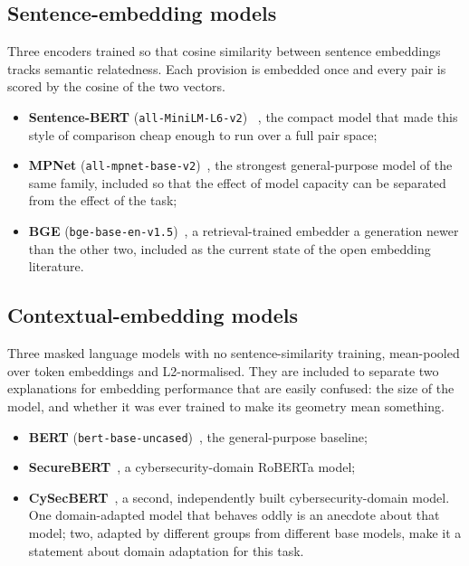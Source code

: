 \subsection{Sentence-embedding models}

Three encoders trained so that cosine similarity between sentence embeddings
tracks semantic relatedness. Each provision is embedded once and every pair is
scored by the cosine of the two vectors.

\begin{itemize}
  \item \textbf{Sentence-BERT} (\texttt{all-MiniLM-L6-v2})
  ~\cite{reimers2019sbert}, the compact model that made this style of
  comparison cheap enough to run over a full pair space;
  \item \textbf{MPNet} (\texttt{all-mpnet-base-v2})~\cite{song2020mpnet}, the
  strongest general-purpose model of the same family, included so that the
  effect of model capacity can be separated from the effect of the task;
  \item \textbf{BGE} (\texttt{bge-base-en-v1.5})~\cite{xiao2024bge}, a
  retrieval-trained embedder a generation newer than the other two, included as
  the current state of the open embedding literature.
\end{itemize}

\subsection{Contextual-embedding models}

Three masked language models with no sentence-similarity training, mean-pooled
over token embeddings and L2-normalised. They are included to separate two
explanations for embedding performance that are easily confused: the size of the
model, and whether it was ever trained to make its geometry mean something.

\begin{itemize}
  \item \textbf{BERT} (\texttt{bert-base-uncased})~\cite{devlin2019bert}, the
  general-purpose baseline;
  \item \textbf{SecureBERT}~\cite{aghaei2022securebert}, a
  cybersecurity-domain RoBERTa model;
  \item \textbf{CySecBERT}~\cite{bayer2024cysecbert}, a second, independently
  built cybersecurity-domain model. One domain-adapted model that behaves oddly
  is an anecdote about that model; two, adapted by different groups from
  different base models, make it a statement about domain adaptation for this
  task.
\end{itemize}

